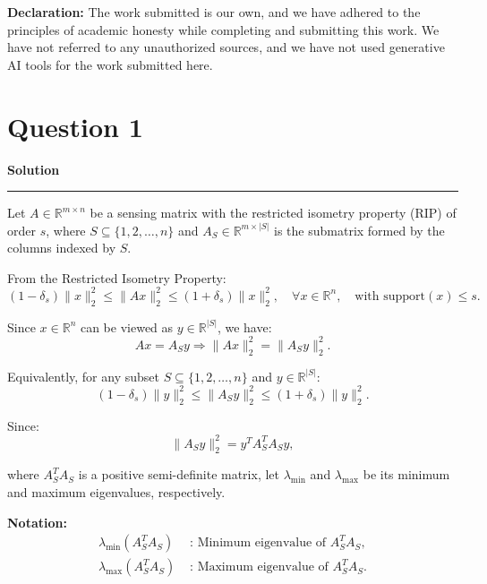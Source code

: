\documentclass[a4paper,12pt]{article}
\title{\cooltitle{CS754 Assignment-1}}
\author{{\bf Saksham Rathi, Ekansh Ravi Shankar, Kshitij Vaidya}}
\date{}
\newenvironment{solution}[2][]{%
    \begin{mdframed}[linecolor=blue!70!black, linewidth=2pt, roundcorner=10pt, backgroundcolor=yellow!10!white, skipabove=12pt, skipbelow=12pt]%
        \textbf{\large #2}
        \par\noindent\rule{\textwidth}{0.4pt}
}{
    \end{mdframed}
}
\begin{document}
\maketitle
\textbf{Declaration:} The work submitted is our own, and
we have adhered to the principles of academic honesty while completing and submitting this work. We have not referred to any unauthorized sources, and we have not used generative AI tools for the work submitted here.

\section*{Question 1}

\begin{solution}{Solution}
 
Let $A \in \mathbb{R}^{m \times n}$ be a sensing matrix with the restricted isometry property (RIP) of order $s$, where $S \subseteq \{1,2,\dots,n\}$ and $A_S \in \mathbb{R}^{m \times |S|}$ is the submatrix formed by the columns indexed by $S$.
  
From the Restricted Isometry Property:
\begin{equation}
(1 - \delta_s)\|x\|_2^2 \leq \|A x\|_2^2 \leq (1 + \delta_s)\|x\|_2^2, \quad \forall x \in \mathbb{R}^n, \quad \text{with support}(x) \leq s.
\end{equation}
  
Since $x \in \mathbb{R}^n$ can be viewed as $y \in \mathbb{R}^{|S|}$, we have:
\begin{equation}
    Ax = A_S y \Rightarrow \|Ax\|_2^2 = \|A_S y\|_2^2.
\end{equation}
  
Equivalently, for any subset $S \subseteq \{1,2,\dots,n\}$ and $y \in \mathbb{R}^{|S|}$:
\begin{equation}
(1 - \delta_s)\|y\|_2^2 \leq \|A_S y\|_2^2 \leq (1 + \delta_s)\|y\|_2^2.
\end{equation}
  
Since:
\begin{equation}
\|A_S y\|_2^2 = y^T A_S^T A_S y,
\end{equation}
  
where $A_S^T A_S$ is a positive semi-definite matrix, let $\lambda_{\min}$ and $\lambda_{\max}$ be its minimum and maximum eigenvalues, respectively.
  
\textbf{Notation:}
\begin{align*}
    \lambda_{\min}(A_S^T A_S) & \text{ : Minimum eigenvalue of } A_S^T A_S, \\
    \lambda_{\max}(A_S^T A_S) & \text{ : Maximum eigenvalue of } A_S^T A_S.
\end{align*}
  

\end{solution}
\end{document}

